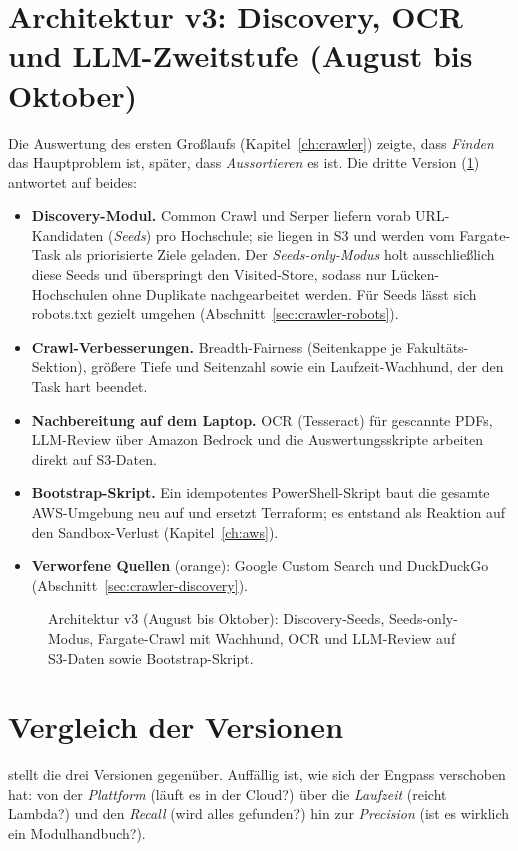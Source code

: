 \section{Architektur v3: Discovery, OCR und LLM-Zweitstufe (August bis Oktober)}\label{sec:arch-v3}
Die Auswertung des ersten Großlaufs (Kapitel~\ref{ch:crawler}) zeigte, dass \emph{Finden} das Hauptproblem ist, später, dass \emph{Aussortieren} es ist. Die dritte Version (\cref{fig:archC}) antwortet auf beides:
\begin{itemize}
  \item \textbf{Discovery-Modul.} Common Crawl und Serper liefern vorab URL-Kandidaten (\emph{Seeds}) pro Hochschule; sie liegen in S3 und werden vom Fargate-Task als priorisierte Ziele geladen. Der \emph{Seeds-only-Modus} holt ausschließlich diese Seeds und überspringt den Visited-Store, sodass nur Lücken-Hochschulen ohne Duplikate nachgearbeitet werden. Für Seeds lässt sich robots.txt gezielt umgehen (Abschnitt~\ref{sec:crawler-robots}).
  \item \textbf{Crawl-Verbesserungen.} Breadth-Fairness (Seitenkappe je Fakultäts-Sektion), größere Tiefe und Seitenzahl sowie ein Laufzeit-Wachhund, der den Task hart beendet.
  \item \textbf{Nachbereitung auf dem Laptop.} OCR (Tesseract) für gescannte PDFs, LLM-Review über Amazon Bedrock und die Auswertungsskripte arbeiten direkt auf S3-Daten.
  \item \textbf{Bootstrap-Skript.} Ein idempotentes PowerShell-Skript baut die gesamte AWS-Umgebung neu auf und ersetzt Terraform; es entstand als Reaktion auf den Sandbox-Verlust (Kapitel~\ref{ch:aws}).
  \item \textbf{Verworfene Quellen} (orange): Google Custom Search und DuckDuckGo (Abschnitt~\ref{sec:crawler-discovery}).
\end{itemize}

\begin{figure}\centering
  \resizebox{0.95\linewidth}{!}{\archC}
  \caption{Architektur v3 (August bis Oktober): Discovery-Seeds, Seeds-only-Modus, Fargate-Crawl mit Wachhund, OCR und LLM-Review auf S3-Daten sowie Bootstrap-Skript.}\label{fig:archC}
\end{figure}

\section{Vergleich der Versionen}
 stellt die drei Versionen gegenüber. Auffällig ist, wie sich der Engpass verschoben hat: von der \emph{Plattform} (läuft es in der Cloud?) über die \emph{Laufzeit} (reicht Lambda?) und den \emph{Recall} (wird alles gefunden?) hin zur \emph{Precision} (ist es wirklich ein Modulhandbuch?).

